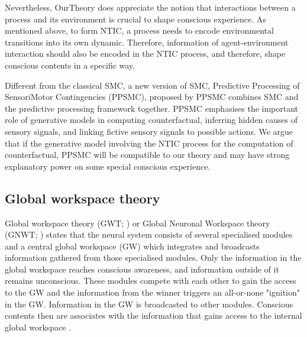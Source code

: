 \documentclass[utf8]{article}
\begin{document}
    	    Nevertheless, \ac{OurTheory} does appreciate the notion that interactions between a process and its environment is crucial to shape conscious experience. As mentioned above, to form NTIC, a process needs to encode environmental transitions into its own dynamic. Therefore, information of agent-environment interaction should also be encoded in the NTIC process, and therefore, shape conscious contents in a specific way. 
    	    
    	    Different from the classical SMC, a new version of SMC, Predictive Processing of SensoriMotor Contingencies (PPSMC), proposed by \cite{seth2014predictive, seth2015presence} PPSMC combines SMC and the predictive processing framework together. PPSMC emphasises the important role of generative models in computing counterfactual, inferring hidden causes of sensory signals, and linking fictive sensory signals to possible actions. We argue that if the generative model involving the NTIC process for the computation of counterfactual, PPSMC will be compatible to our theory and may have strong explanatory power on some special conscious experience.
    	    
				
        
		\subsection{Global workspace theory}
		Global workspace theory (GWT; \cite{baars1988cognitive, baars1997theatre, baars2002conscious}) or Global Neuronal Workspace theory (GNWT; \cite{dehaene1998neuronal, dehaene2001towards, dehaene2011experimental}) states that the neural system consists of several specialised modules and a central global workspace (GW) which integrates and broadcasts information gathered from those specialised modules. Only the information in the global workspace reaches conscious awareness, and information outside of it remains unconscious. These modules compete with each other to gain the access to the GW and the information from the winner triggers an all-or-none "ignition" in the GW. Information in the GW is broadcasted to other modules. Conscious contents then are associates with the information that gains access to the internal global workspace \cite{Dehaene2017}.
		
\end{document}
